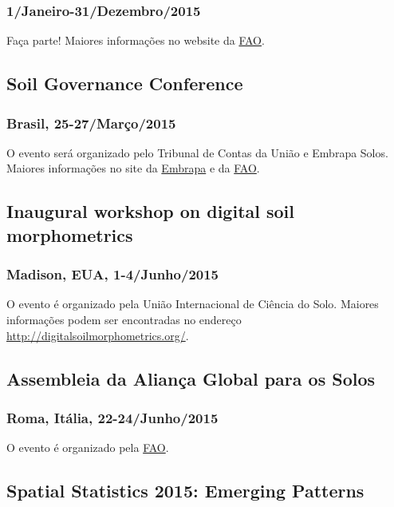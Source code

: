 \subsubsection{1/Janeiro-31/Dezembro/2015}
Faça parte! Maiores informações no website da \href{http://www.fao.org/globalsoilpartnership/iys-2015/en/}{FAO}.

\subsection{Soil Governance Conference}
\subsubsection{Brasil, 25-27/Março/2015}
O evento será organizado pelo Tribunal de Contas da União e Embrapa Solos. Maiores informações no site da \href{https://www.embrapa.br/busca-de-noticias/-/noticia/1931438/brasil-recebe-evento-sobre-governanca-em-solos-em-2015}{Embrapa} e da \href{http://www.fao.org/fileadmin/user_upload/GSP/docs/plenary_assembly_II/Presentations/Keynote_speaker_opening_of_the_GSP_PA.pdf}{FAO}.

\subsection{Inaugural workshop on digital soil morphometrics}
\subsubsection{Madison, EUA, 1-4/Junho/2015}
O evento é organizado pela União Internacional de Ciência do Solo.
Maiores informações podem ser encontradas no endereço \url{http://digitalsoilmorphometrics.org/}.

\subsection{Assembleia da Aliança Global para os Solos}
\subsubsection{Roma, Itália, 22-24/Junho/2015}

O evento é organizado pela \href{http://www.fao.org/globalsoilpartnership/en/}{FAO}.

\subsection{Spatial Statistics 2015: Emerging Patterns}
